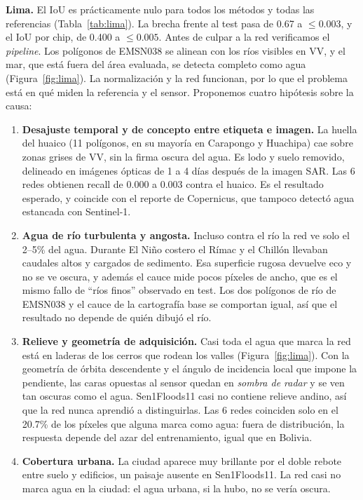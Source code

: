 \documentclass{article}
\begin{document}
\textbf{Lima.} El IoU es prácticamente nulo para todos los métodos y todas las referencias (Tabla~\ref{tab:lima}). La brecha frente al test pasa de 0.67 a $\leq 0.003$, y el IoU por chip, de 0.400 a $\leq 0.005$. Antes de culpar a la red verificamos el \emph{pipeline}. Los polígonos de EMSN038 se alinean con los ríos visibles en VV, y el mar, que está fuera del área evaluada, se detecta completo como agua (Figura~\ref{fig:lima}). La normalización y la red funcionan, por lo que el problema está en qué miden la referencia y el sensor. Proponemos cuatro hipótesis sobre la causa:

\begin{enumerate}
  \item \textbf{Desajuste temporal y de concepto entre etiqueta e imagen.} La huella del huaico (11 polígonos, en su mayoría en Carapongo y Huachipa) cae sobre zonas grises de VV, sin la firma oscura del agua. Es lodo y suelo removido, delineado en imágenes ópticas de 1 a 4 días después de la imagen SAR. Las 6 redes obtienen recall de 0.000 a 0.003 contra el huaico. Es el resultado esperado, y coincide con el reporte de Copernicus, que tampoco detectó agua estancada con Sentinel-1.
  \item \textbf{Agua de río turbulenta y angosta.} Incluso contra el río la red ve solo el 2--5\% del agua. Durante El Niño costero el Rímac y el Chillón llevaban caudales altos y cargados de sedimento. Esa superficie rugosa devuelve eco y no se ve oscura, y además el cauce mide pocos píxeles de ancho, que es el mismo fallo de ``ríos finos'' observado en test. Los dos polígonos de río de EMSN038 y el cauce de la cartografía base se comportan igual, así que el resultado no depende de quién dibujó el río.
  \item \textbf{Relieve y geometría de adquisición.} Casi toda el agua que marca la red está en laderas de los cerros que rodean los valles (Figura~\ref{fig:lima}). Con la geometría de órbita descendente y el ángulo de incidencia local que impone la pendiente, las caras opuestas al sensor quedan en \emph{sombra de radar} y se ven tan oscuras como el agua. Sen1Floods11 casi no contiene relieve andino, así que la red nunca aprendió a distinguirlas. Las 6 redes coinciden solo en el 20.7\% de los píxeles que alguna marca como agua: fuera de distribución, la respuesta depende del azar del entrenamiento, igual que en Bolivia.
  \item \textbf{Cobertura urbana.} La ciudad aparece muy brillante por el doble rebote entre suelo y edificios, un paisaje ausente en Sen1Floods11. La red casi no marca agua en la ciudad: el agua urbana, si la hubo, no se vería oscura.
\end{enumerate}
\end{document}
